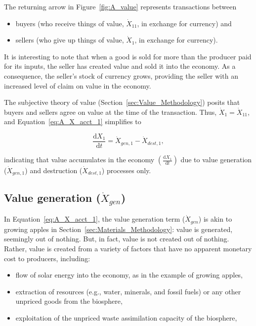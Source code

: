 The returning arrow in Figure~\ref{fig:A_value} 
represents transactions between 
\begin{itemize}
	\item{buyers (who receive things of value, $\dot{X}_{11}$,
	in exchange for currency) and}
	\item{sellers (who give up things of value, $\dot{X}_{1}$,
	in exchange for currency).}
\end{itemize}

It is interesting to note that when a good is sold for more
than the producer paid for its inputs, 
the seller has created value and sold it into the economy. 
As a consequence, the seller's stock of currency grows,
providing the seller with an increased level of claim 
on value in the economy.

The subjective theory of value
(Section~\ref{sec:Value_Methodology})
posits that buyers and sellers agree on value at the 
time of the transaction.
Thus, $\dot{X}_{1} = \dot{X}_{11}$, and Equation~\ref{eq:A_X_acct_1}
simplifies to

\begin{equation} \label{eq:A_X_acct_2}	
	\frac{\mathrm{d}X_{1}}{\mathrm{d}t}	
	= \dot{X}_{gen,1}
	- \dot{X}_{dest,1},
\end{equation}

\noindent{}indicating that value accumulates in the economy
$\left( \frac{\mathrm{d}X_{1}}{\mathrm{d}t} \right)$
due to value generation ($\dot{X}_{gen,1}$) 
and destruction ($\dot{X}_{dest,1}$) processes only.


\subsection{Value generation ($\dot{X}_{gen}$)}

\noindent In Equation~\ref{eq:A_X_acct_1}, 
the value generation term ($\dot{X}_{gen}$) is akin to growing apples
in Section~\ref{sec:Materials_Methodology}: 
value is generated, seemingly out of nothing.
But, in fact, value is not created out of nothing. 
Rather, value is created from a variety of factors that have no apparent 
monetary cost to producers, including:

\begin{itemize}
	\item{flow of solar energy
	into the economy,
	as in the example of growing apples,}
	\item{extraction of resources (e.g., water, minerals, and
	fossil fuels) or any other unpriced goods from the biosphere,}
	\item{exploitation of the unpriced waste assimilation capacity of the biosphere,}
\end{itemize}

